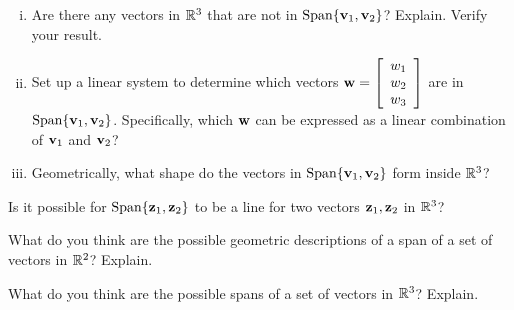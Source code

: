 \begin{activity}
\begin{enumerate}[i.]
        

		\item Are there any vectors in $\mathbb{R}^3$ that are not in $\text{Span}\{\mathbf{v}_1, \mathbf{v}_2\}$? Explain. Verify your result.



		\item Set up a linear system to determine which vectors $\mathbf{w}= \left[ \begin{array}{c} w_1 \\ w_2\\ w_3 \end{array} \right]$ are in $\text{Span}\{\mathbf{v}_1, \mathbf{v}_2\}$. Specifically, which $\mathbf{w}$ can be expressed as a linear combination of $\mathbf{v}_1$ and $\mathbf{v}_2$?

    
		
		\item Geometrically, what shape do the vectors in $\text{Span}\{\mathbf{v}_1, \mathbf{v}_2\}$ form inside $\mathbb{R}^3$?
		
		\end{enumerate}
		

\item Is it possible for $\text{Span}\{\mathbf{z}_1, \mathbf{z}_2\}$ to be a line for two vectors $\mathbf{z}_1, \mathbf{z}_2$ in $\mathbb{R}^3$?
		
	
    \item What do you think are the possible geometric descriptions of a span of a set of vectors in $\mathbb{R}^2$? Explain.

    

    \item What do you think are the possible spans of a set of vectors in $\mathbb{R}^3$? Explain.

    

    \ea
\end{activity}


\label{sec:vec_rep_exam}

\ExampleIntro

